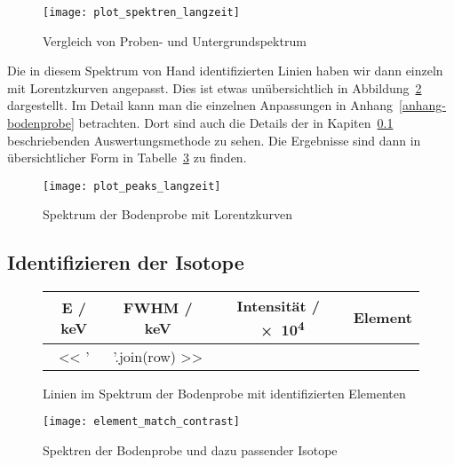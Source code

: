 \documentclass[11pt, ngerman, fleqn, DIV=15, headinclude, BCOR=2cm]{scrreprt}
\newcommand{\plotwidth}{0.8\linewidth}
\begin{document}
\begin{figure}
	\centering
	\texttt{[image: plot\_spektren\_langzeit]}
	\caption{%
		Vergleich von Proben- und Untergrundspektrum
	}
	\label{fig:langzeit_probe_untergrund}
\end{figure}

Die in diesem Spektrum von Hand identifizierten Linien haben wir dann einzeln
mit Lorentzkurven angepasst. Dies ist etwas unübersichtlich in
Abbildung~\ref{fig:langzeit_probe_peaks} dargestellt. Im Detail kann man die
einzelnen Anpassungen in Anhang~\ref{anhang-bodenprobe} betrachten. Dort sind
auch die Details der in Kapiten~\ref{identifizieren-isotope} beschriebenden
Auswertungsmethode zu sehen.
Die Ergebnisse sind dann in übersichtlicher Form in
Tabelle~\ref{tab:langzeit-anpassungen-tabelle} zu finden.

\begin{figure}
	\centering
	\texttt{[image: plot\_peaks\_langzeit]}
	\caption{%
		Spektrum der Bodenprobe mit Lorentzkurven
	}
	\label{fig:langzeit_probe_peaks}
\end{figure}

\subsection{Identifizieren der Isotope}\label{identifizieren-isotope}



\begin{figure}[h]
	\centering
	\begin{tabular}{SSSl}
		{E / \si{\kilo\electronvolt}} &
		{FWHM / \si{\kilo\electronvolt}} &
            {Intensität / \num{e4}} &
            {Element}\\
		\midrule
		<< ' & '.join(row) >> \\
	\end{tabular}
	\caption{%
		Linien im Spektrum der Bodenprobe mit identifizierten Elementen
	}
	\label{tab:langzeit-anpassungen-tabelle}
\end{figure}


\begin{figure}
    \centering
    \texttt{[image: element\_match\_contrast]}
    \caption{%
	    Spektren der Bodenprobe und dazu passender Isotope
    }
    \label{fig:element_match}
\end{figure}
\end{document}
